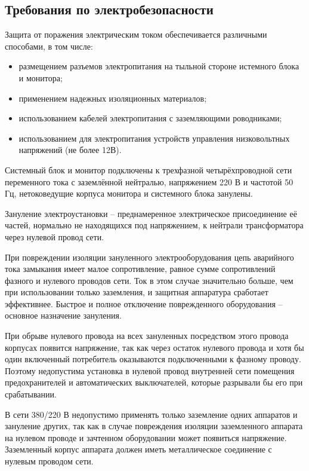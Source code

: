 \subsection{Требования по электробезопасности}
Защита от поражения электрическим током обеспечивается различными способами, в том числе:
\begin{itemize}
	\item размещением разъемов электропитания на тыльной стороне истемного блока и монитора;
	\item применением надежных изоляционных материалов;
	\item использованием кабелей электропитания с заземляющими роводниками;
	\item использованием для электропитания устройств управления низковольтных напряжений (не более 12В).
\end{itemize}

Системный блок и монитор подключены к трехфазной четырёхпроводной сети переменного тока с заземлённой нейтралью, напряжением 220 В и частотой 50 Гц, нетоковедущие корпуса монитора и системного блока занулены.

Зануление электроустановки -- преднамеренное электрическое присоединение её частей, нормально не находящихся под напряжением, к нейтрали трансформатора через нулевой провод сети.

При повреждении изоляции зануленного электрооборудования цепь аварийного тока замыкания имеет малое сопротивление, равное сумме сопротивлений фазного и нулевого проводов сети. Ток в этом случае значительно больше, чем при использовании только заземления, и защитная аппаратура сработает эффективнее. Быстрое и полное отключение поврежденного оборудования -- основное назначение зануления.

При обрыве нулевого провода на всех зануленных посредством этого провода корпусах появится напряжение, так как через остаток нулевого провода и хотя бы один включенный потребитель оказываются подключенными к фазному проводу. Поэтому недопустима установка в нулевой провод внутренней сети помещения предохранителей и автоматических выключателей, которые разрывали бы его при срабатывании.

В сети 380/220 В недопустимо применять только заземление одних аппаратов и зануление других, так как в случае повреждения изоляции заземленного аппарата на нулевом проводе и зачтенном оборудовании может появиться напряжение. Заземленный корпус аппарата должен иметь металлическое соединение с нулевым проводом сети.

